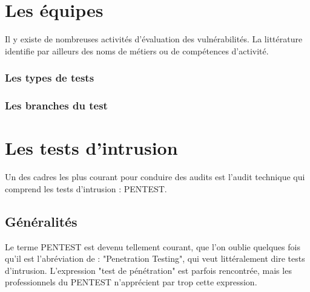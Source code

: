 \uchap{\jobname}

\section{Les équipes}

Il y existe de nombreuses activités d'évaluation des vulnérabilités. La littérature identifie par ailleurs des noms de métiers ou de compétences d'activité.

\begin{frame}
\frametitle<presentation>{Les types de tests}
\end{frame}


\begin{frame}
\frametitle<presentation>{Les branches du test}
\end{frame}




\section{Les tests d'intrusion}

Un des cadres les plus courant pour conduire des audits est l'audit technique qui comprend les tests d'intrusion : PENTEST.

\subsection{Généralités}

Le terme PENTEST est devenu tellement courant, que l'on oublie quelques fois qu'il est l'abréviation de : "Penetration Testing", qui  veut littéralement dire tests d'intrusion.  L'expression  "test de pénétration" est parfois rencontrée, mais les professionnels du PENTEST n'apprécient par trop cette expression. 

